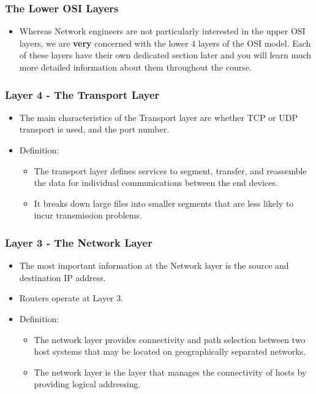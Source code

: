 \documentclass[pdflatex,compress]{beamer}
\begin{document}
\begin{frame}
	\frametitle{The Lower OSI Layers}
	\begin{itemize}
		\item Whereas Network engineers are not particularly interested in the upper OSI layers, we are \textbf{very} concerned with the lower 4 layers of the OSI model.
		Each of these layers have their own dedicated section later and you will learn much more detailed information about them throughout the course.
	\end{itemize}
\end{frame}

\begin{frame}
	\frametitle{Layer 4 - The Transport Layer}
	\begin{itemize}
		\item The main characteristics of the Transport layer are whether TCP or UDP transport is used, and the port number.
		\item Definition:
		\begin{itemize}
			\item The transport layer defines services to segment, transfer, and reassemble the data for individual communications between the end devices.
			\item It breaks down large files into smaller segments that are less likely to incur transmission problems.
		\end{itemize}
	\end{itemize}
\end{frame}

\begin{frame}
	\frametitle{Layer 3 - The Network Layer}
	\begin{itemize}
		\item The most important information at the Network layer is the source and destination IP address.
		\item Routers operate at Layer 3.
		\item Definition:
		\begin{itemize}
			\item The network layer provides connectivity and path selection between two host systems that may be located on geographically separated networks.
			\item The network layer is the layer that manages the connectivity of hosts by providing logical addressing.
		\end{itemize}
	\end{itemize}
\end{frame}
\end{document}
